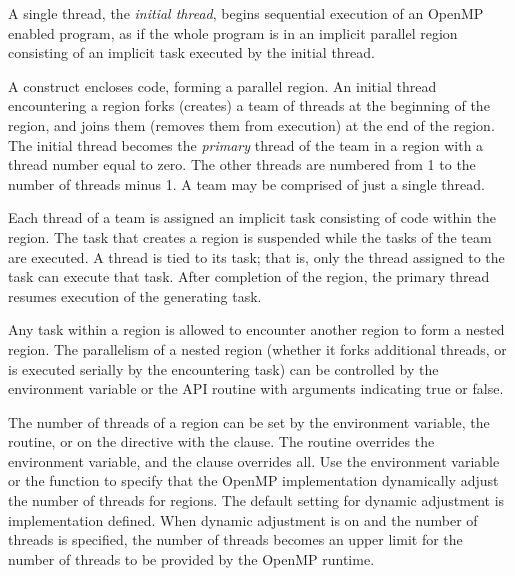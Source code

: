 \label{chap:parallel_execution}

A single thread, the \emph{initial thread}, begins sequential execution of 
an OpenMP enabled program, as if the whole program is in an implicit parallel
region consisting of an implicit task executed by the initial thread.

A  construct encloses code, 
forming a parallel region.  An initial thread encountering a  
region forks (creates) a team of threads at the beginning of the 
 region, and joins them (removes them from execution) at the 
end of the region.  The initial thread becomes the \emph{primary} thread of the team in a 
 region with a thread number equal to zero. The other 
threads are numbered from 1 to the number of threads minus 1. 
A team may be comprised of just a single thread.

Each thread of a team is assigned an implicit task consisting of code within the 
 region. The task that creates a  region is suspended while the
tasks of the team are executed.  A thread is tied to its task; that is,
only the thread assigned to the task can execute that task.  After completion 
of the  region, the primary thread resumes execution of the generating task.  


Any task within a  region is allowed to encounter another
 region to form a nested  region. The 
parallelism of a nested  region (whether it forks additional 
threads, or is executed serially by the encountering task) can be controlled by the
 environment variable or the  
API routine with arguments indicating true or false.

The number of threads of a  region can be set by the 
environment variable, the  routine, or on the  
directive with the 
clause. The routine overrides the environment variable, and the clause overrides all. 
Use the  environment variable
or the  function to specify that the OpenMP
implementation dynamically adjust the number of threads for
 regions. The default setting for dynamic adjustment is implementation
defined. When dynamic adjustment is on and the number of threads is specified,
the number of threads becomes an upper limit for the number of threads to be
provided by the OpenMP runtime.

